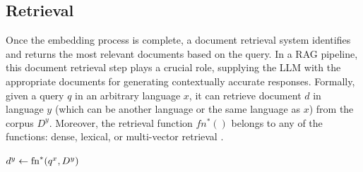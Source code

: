 
\subsection{Retrieval}

Once the embedding process is complete, a document retrieval system identifies and returns the most relevant documents based on the query. In a RAG pipeline, this document retrieval step plays a crucial role, supplying the LLM with the appropriate documents for generating contextually accurate responses. Formally, given a query $q$ in an arbitrary language $x$, it can retrieve document $d$ in language $y$ (which can be another language or the same language as $x$) from the corpus $D^y$. Moreover, the retrieval function $fn^*()$ belongs to any of the functions: dense, lexical, or multi-vector retrieval \cite{chen2024bge}.
\begin{center}
    $d^y \leftarrow {\rm{fn}}^*(q^x, D^y)$
\end{center}
